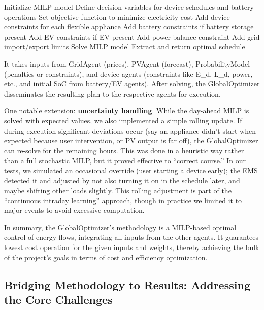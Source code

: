 \documentclass[12pt,a4paper]{article}
\begin{document}
\begin{algorithm}[h!]
\caption{GlobalOptimizer Daily Scheduling Algorithm}
\label{alg:global_optimizer}
\begin{algorithmic}[1]
    \State Initialize MILP model
    \State Define decision variables for device schedules and battery operations
    \State Set objective function to minimize electricity cost
    \State Add device constraints for each flexible appliance
    \State Add battery constraints if battery storage present
    \State Add EV constraints if EV present
    \State Add power balance constraint
    \State Add grid import/export limits
    \State Solve MILP model
    \State Extract and return optimal schedule
\EndProcedure
\end{algorithmic}
\end{algorithm}
It takes inputs from GridAgent (prices), PVAgent (forecast), ProbabilityModel (penalties or constraints), and device agents (constraints like E_d, L_d, power, etc., and initial SoC from battery/EV agents). After solving, the GlobalOptimizer disseminates the resulting plan to the respective agents for execution.

One notable extension: \textbf{uncertainty handling}. While the day-ahead MILP is solved with expected values, we also implemented a simple rolling update. If during execution significant deviations occur (say an appliance didn’t start when expected because user intervention, or PV output is far off), the GlobalOptimizer can re-solve for the remaining hours. This was done in a heuristic way rather than a full stochastic MILP, but it proved effective to “correct course.” In our tests, we simulated an occasional override (user starting a device early); the EMS detected it and adjusted by not also turning it on in the schedule later, and maybe shifting other loads slightly. This rolling adjustment is part of the “continuous intraday learning” approach, though in practice we limited it to major events to avoid excessive computation.

In summary, the GlobalOptimizer's methodology is a MILP-based optimal control of energy flows, integrating all inputs from the other agents. It guarantees lowest cost operation for the given inputs and weights, thereby achieving the bulk of the project's goals in terms of cost and efficiency optimization.

\subsection{Bridging Methodology to Results: Addressing the Core Challenges}
\end{document}
